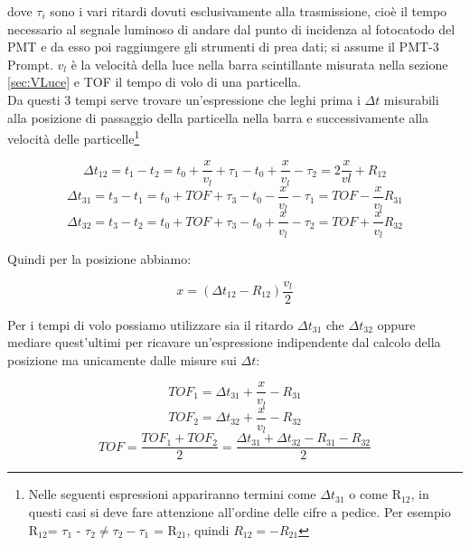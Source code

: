 \documentclass[a4paper]{article}
\begin{document}
dove $\tau_i$ sono i vari ritardi dovuti esclusivamente alla trasmissione, cioè il tempo necessario al segnale luminoso di andare dal punto di incidenza al fotocatodo del PMT e da esso poi raggiungere gli strumenti di prea dati; si assume il PMT-3 Prompt. $v_l$ è la velocità della luce nella barra scintillante misurata nella sezione \ref{sec:VLuce} e TOF il tempo di volo di una particella.\\
Da questi 3 tempi serve trovare un'espressione che leghi prima i $\Delta t$ misurabili alla posizione di passaggio della particella nella barra e successivamente alla velocità delle particelle\footnote{Nelle seguenti espressioni appariranno termini come $\Delta t_{31}$ o come R$_{12}$, in questi casi si deve fare attenzione all'ordine delle cifre a pedice. Per esempio R$_{12}$= $\tau_1$ - $\tau_2 \neq \tau_2 - \tau_1$ = R$_{21}$, quindi $R_{12}=-R_{21}$}

\begin{equation}
\Delta t_{12} = t_1 - t_2 = t_0 + \frac{x}{v_l} + \tau_1 - t_0 + \frac{x}{v_l} - \tau_2 = 2\frac{x}{vl} + R_{12}
\end{equation}
\begin{equation}
\Delta t_{31} = t_3 - t_1 = t_0 + TOF + \tau_3 - t_0 - \frac{x}{v_l} - \tau_1 = TOF - \frac{x}{v_l} R_{31}
\end{equation}
\begin{equation}
\Delta t_{32} = t_3 - t_2 = t_0 + TOF + \tau_3 - t_0 + \frac{x}{v_l} - \tau_2 = TOF + \frac{x}{v_l} R_{32}
\end{equation}

Quindi per la posizione abbiamo:

\begin{equation}
x = (\Delta t_{12} - R_{12})\frac{v_l}{2}
\label{eq:PosX}
\end{equation}

Per i tempi di volo possiamo utilizzare sia il ritardo $\Delta t_{31}$ che $\Delta t_{32}$ oppure mediare quest'ultimi per ricavare un'espressione indipendente dal calcolo della posizione ma unicamente dalle misure sui $\Delta t$:

\begin{equation}
TOF_1 = \Delta t_{31} + \frac{x}{v_l} - R_{31}
\label{eq:TOF1}
\end{equation}
\begin{equation}
TOF_2 = \Delta t_{32} + \frac{x}{v_l} - R_{32}
\label{eq:TOF2}
\end{equation}
\begin{equation}
TOF = \frac{TOF_1 + TOF_2}{2} = \frac{\Delta t_{31} + \Delta t_{32} - R_{31} - R_{32}}{2}
\label{eq:TOF}
\end{equation}
\end{document}
